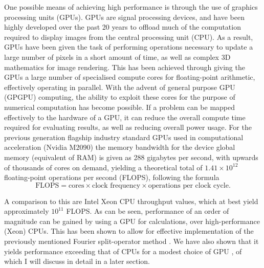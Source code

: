 One possible means of achieving high performance is through the use of graphics processing units (GPUs). GPUs are signal processing devices, and have been highly developed over the past 20 years to offload much of the computation required to display images from the central processing unit (CPU). As a result, GPUs have been given the task of performing operations necessary to update a large number of pixels in a short amount of time, as well as complex 3D mathematics for image rendering. This has been achieved through giving the GPUs a large number of specialised compute cores for floating-point arithmetic, effectively operating in parallel. With the advent of general purpose GPU (GPGPU) computing, the ability to exploit these cores for the purpose of numerical computation has become possible. If a problem can be mapped effectively to the hardware of a GPU, it can reduce the overall compute time required for evaluating results, as well as reducing overall power usage. For the previous generation flagship industry standard GPUs used in computational acceleration (Nvidia M2090) the memory bandwidth for the device global memory (equivalent of RAM) is given as 288 gigabytes per second, with upwards of thousands of cores on demand, yielding a theoretical total of $1.41\times10^{12}$ floating-point operations per second (FLOPS), following the formula
\begin{equation}
    \text{FLOPS} = \text{cores}\times\text{clock frequency}\times\text{operations per clock cycle}.
\end{equation}

A comparison to this are Intel Xeon CPU throughput values, which at best yield approximately $10^{11}$ FLOPS. As can be seen, performance of an order of magnitude can be gained by using a GPU for calculations, over high-performance (Xeon) CPUs. This has been shown to allow for effective implementation of the previously mentioned Fourier split-operator method \cite{Num:Bauke_cpc_2011}. We have also shown that it yields performance exceeding that of CPUs for a modest choice of GPU \cite{AO:Morgan_pra_2013}, of which I will discuss in detail in a later section.

